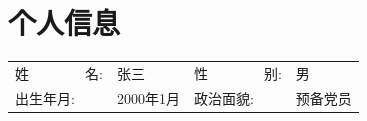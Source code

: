 \begin{figure}[h]
    \begin{minipage}{0.82\textwidth}
        \section{\makebox[\widthof{\faAddressCard}][c]{\color{HIT_Blue}{\faAddressCard}}\quad 个人信息}
        \begin{tabularx}{\linewidth}{p{}Xp{}X}
            姓\ \ \ \ \ \ \ \ 名: & 张三 & 
            性\ \ \ \ \ \ \ \ 别: & 男  \\
            出生年月: & 2000年1月 & 
            政治面貌: & 预备党员 \\
        \end{tabularx}
    \end{minipage}
    \hspace{2em}
    \begin{minipage}{0.12\textwidth}
        \setlength{\fboxsep}{0pt}
    \end{minipage}
\end{figure}
\vspace{-1em}

